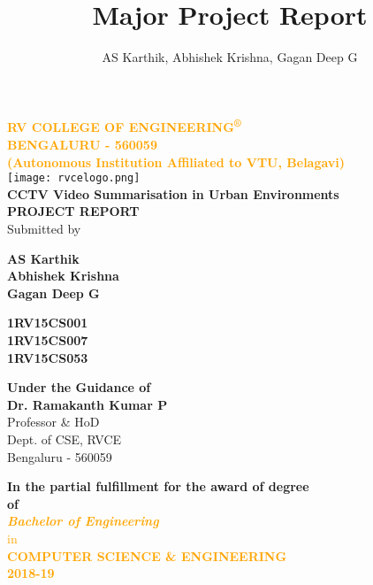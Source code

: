 \title{Major Project Report}
\author{AS Karthik, Abhishek Krishna, Gagan Deep G}


\begin{center}
	\textbf {
		\textcolor{orange}{
			\Large RV COLLEGE OF ENGINEERING\textsuperscript{®}\\
			\Large BENGALURU - 560059\\
			\small(Autonomous Institution Affiliated to VTU, Belagavi)\\[1cm]
		}
	}
	\texttt{[image: rvcelogo.png]}\\[1cm]
	\Large \textbf{CCTV Video Summarisation in Urban Environments}\\[1cm]
	\large \textbf{PROJECT REPORT} \\[0.5cm]
	\normalsize Submitted by\\

	\begin{multicols}{2}
		\begin{flushright}
			\large \textbf{AS Karthik}\\
			\large \textbf{Abhishek Krishna}\\
			\large \textbf{Gagan Deep G}
		\end{flushright}

		\columnbreak

		\begin{flushleft}
			\large \textbf{1RV15CS001}\\
			\large \textbf{1RV15CS007}\\
			\large \textbf{1RV15CS053}
		\end{flushleft}
	\end{multicols}

	\bigskip

	\normalsize \textbf{Under the Guidance of}\\

	\normalsize \textbf{Dr. Ramakanth Kumar P}\\
	\normalsize Professor \& HoD\\
	\normalsize Dept. of CSE, RVCE\\
	\normalsize Bengaluru - 560059\\

	\bigskip
	\medskip

	\normalsize \textbf {In the partial fulfillment for the award of degree}\\
	\normalsize \textbf {of}\\
	\textcolor{orange}{
		\normalsize \textbf {\textit{Bachelor of Engineering}}\\ in \\
		\normalsize \textbf {COMPUTER SCIENCE \& ENGINEERING \\ 2018-19}
	}

\end{center}




